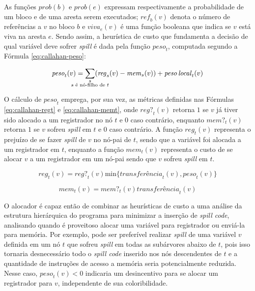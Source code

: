\documentclass[
	12pt,				%
	openright,			%
	oneside,			%
	a4paper,			%
	tccpreliminar,			%
	]{ABNT-DC-UEL}
\begin{document}
As funções $\mathit{prob}(b)$ e $\mathit{prob}(e)$ expressam respectivamente a probabilidade de um bloco e de uma aresta serem executados; $\mathit{ref}_b(v)$ denota o número de referências a $v$ no bloco $b$ e $\mathit{viva}_e(v)$ é uma função booleana que indica se $v$ está viva na aresta $e$. Sendo assim, a heurística de custo que fundamenta a decisão de qual variável deve sofrer \textit{spill} é dada pela função $\mathit{peso}_t$, computada segundo a Fórmula \ref{eq:callahan-peso}:

\begin{equation}
    \mathit{peso}_t(v) = \sum_{\mathclap{\substack{s\\s \text{ é nó-filho de } t}}} (\mathit{reg}_s(v) - \mathit{mem}_s(v)) + \mathit{peso\,local}_t(v)
    \label{eq:callahan-peso}
\end{equation}

O cálculo de $\mathit{peso}_t$ emprega, por sua vez, as métricas definidas nas Fórmulas \ref{eq:callahan-regt} e \ref{eq:callahan-memt}, onde $\mathit{reg?}_t(v)$ retorna $1$ se $v$ já tiver sido alocado a um registrador no nó $t$ e $0$ caso contrário, enquanto $\mathit{mem?}_t(v)$ retorna $1$ se $v$ sofreu \textit{spill} em $t$ e $0$ caso contrário. A função $\mathit{reg}_t(v)$ representa o prejuízo de se fazer \textit{spill} de $v$ no nó-pai de $t$, sendo que a variável foi alocada a um registrador em $t$, enquanto a função $\mathit{mem}_t(v)$ representa o custo de se alocar $v$ a um registrador em um nó-pai sendo que $v$ sofreu \textit{spill} em $t$.

\begin{equation}
    \mathit{reg}_t(v) = \mathit{reg?}_t(v)\text{min}\{\mathit{transferência}_t(v), \mathit{peso}_t(v)\}
    \label{eq:callahan-regt}
\end{equation}

\begin{equation}
    \mathit{mem}_t(v) = \mathit{mem?}_t(v)\mathit{transferência}_t(v)
    \label{eq:callahan-memt}
\end{equation}

O alocador é capaz então de combinar as heurísticas de custo a uma análise da estrutura hierárquica do programa para minimizar a inserção de \textit{spill code}, analisando quando é proveitoso alocar uma variável para registrador ou enviá-la para memória. Por exemplo, pode ser preferível realizar \textit{spill} de uma variável $v$ definida em um nó $t$ que sofreu \textit{spill} em todas as subárvores abaixo de $t$, pois isso tornaria desnecessário todo o \textit{spill code} inserido nos nós descendentes de $t$ e a quantidade de instruções de acesso a memória seria potencialmente reduzida. Nesse caso, $\mathit{peso}_t(v) < 0$ indicaria um desincentivo para se alocar um registrador para $v$, independente de sua coloribilidade.
\end{document}
